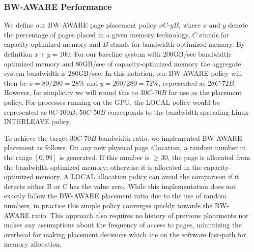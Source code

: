 \subsubsection{BW-AWARE Performance\\}
We define our BW-AWARE page placement policy $xC$-$yB$, where $x$ and $y$ denote the
percentage of pages placed in a given memory technology, $C$ stands for capacity-optimized
memory and $B$ stands for bandwidth-optimized memory. By definition $x+y=100$. For our baseline
system with 200GB/sec bandwidth-optimized memory and 80GB/sec of capacity-optimized memory the
aggregate system bandwidth is 280GB/sec.  In this
notation, our BW-AWARE policy will then be $x=80/280=28\%$ and $y=200/280=72\%$, represented as
$28C$-$72B$. However, for simplicity we will round this to $30C$-$70B$ for use as the 
placement policy.  For processes running on the GPU, the LOCAL policy
would be represented as $0C$-$100B$; $50C$-$50B$ corresponds to the bandwidth spreading Linux
INTERLEAVE policy.

To achieve the target $30C$-$70B$ bandwidth ratio, we implemented BW-AWARE placement as follows.
On any new physical page allocation, a random number in the range $[0,99]$
is generated.  If this number is $\geq30$, the page is allocated from the bandwidth-optimized memory; 
otherwise it is allocated in the capacity-optimized memory. A LOCAL allocation policy can avoid the
comparison if it detects either B or C has the value zero.  While this implementation does
not exactly follow the BW-AWARE placement ratio due to the use of random numbers, in practice this 
simple policy converges quickly towards the BW-AWARE ratio.  This approach also requires no history
of previous placements {\color{black} nor makes any assumptions about the frequency of access to pages}, 
minimizing the overhead for making placement decisions which are on the 
software fast-path for memory allocation.

